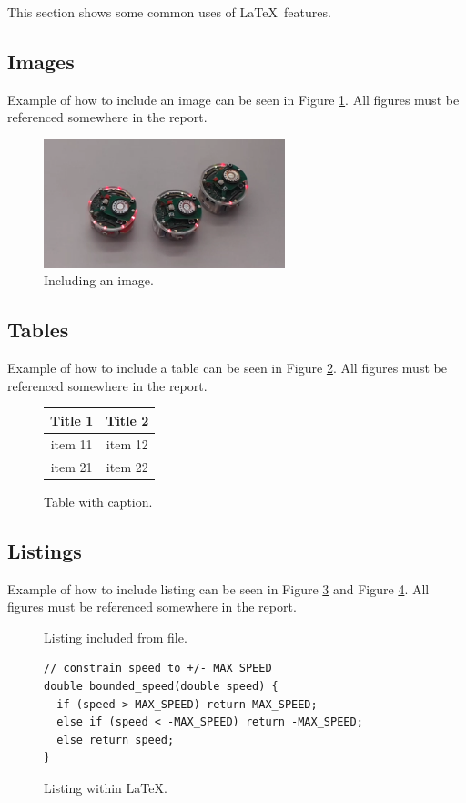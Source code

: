\documentclass[11pt,a4paper]{report}
\begin{document}
This section shows some common uses of \LaTeX\ features.
\subsection{Images}
Example of how to include an image can be seen in Figure \ref{fig:graphicfile}. All figures must be referenced somewhere in the report.
\begin{figure}[ht!]
\begin{center}
\includegraphics[width=7cm]{chain}
\caption{Including an image.}
\label{fig:graphicfile} %
\end{center}
\end{figure}

\subsection{Tables}
Example of how to include a table can be seen in Figure \ref{fig:someTable}. All figures must be referenced somewhere in the report.
\begin{figure}[ht!]
\begin{center}
\begin{tabular}{|c|c|}
\hline
\textbf{Title 1} & \textbf{Title 2} \\
\hline
item 11	&	item 12	\\
\hline
item 21	&	item 22	\\
\hline
\end{tabular}
\end{center}
\caption{Table with caption.}
\label{fig:someTable}
\end{figure}

\subsection{Listings}
Example of how to include listing can be seen in Figure \ref{fig:listing1} and Figure \ref{fig:listing2}. All figures must be referenced somewhere in the report.
\begin{figure}[ht!]

\caption{Listing included from file.}
\label{fig:listing1}
\end{figure}
\begin{figure}[ht!]
\begin{lstlisting}
// constrain speed to +/- MAX_SPEED
double bounded_speed(double speed) { 
  if (speed > MAX_SPEED) return MAX_SPEED;
  else if (speed < -MAX_SPEED) return -MAX_SPEED;
  else return speed;
}
\end{lstlisting}
\caption{Listing within \LaTeX.}
\label{fig:listing2}
\end{figure}
\end{document}
